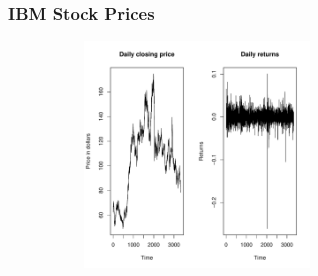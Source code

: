 \documentclass[%
xcolor=pdftex]{beamer}
\begin{document}
\begin{frame}
\frametitle{IBM Stock Prices}

\includegraphics[width=100mm, height=60mm]{pics/ibm.pdf}

\end{frame}
\end{document}
